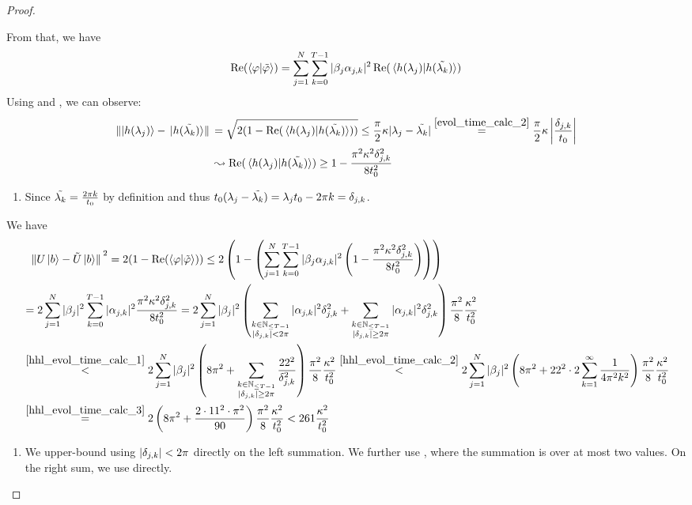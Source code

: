 \begin{proof}
\begin{enumerate}[label=(\roman*), wide]
        From that, we have
        \begin{align}
            \Re(\braket{\varphi}{\tilde{\varphi}}) = \sum_{j=1}^N \sum_{k=0}^{T-1} |\beta_j\alpha_{j, k}|^2 \Re(\braket*{h(\lambda_j)}{h(\tilde{\lambda_k})})
        \end{align}
        Using  and , we can observe:
        \begin{align}
            \norm*{\ket{h(\lambda_j)} - \ket*{h(\tilde{\lambda_k})}} &= \sqrt{2(1-\Re(\braket*{h(\lambda_j)}{h(\tilde{\lambda_k})}))} \leq \frac{\pi}{2}\kappa|\lambda_j-\tilde{\lambda_k}| \overset{\ref{evol_time_calc_2}}{=} \frac{\pi}{2}\kappa\left|\frac{\delta_{j, k}}{t_0}\right|\\
            &\leadsto \Re(\braket*{h(\lambda_j)}{h(\tilde{\lambda_k})}) \geq 1 - \frac{\pi^2\kappa^2\delta_{j, k}^2}{8t_0^2}
        \end{align}
        \begin{enumerate}[label=(\arabic*)]
            \item \label{evol_time_calc_2} Since \(\tilde{\lambda_k} = \frac{2 \pi k}{t_0}\) by definition and thus \(t_0(\lambda_j-\tilde{\lambda_k}) = \lambda_jt_0 - 2\pi k = \delta_{j, k}\).
        \end{enumerate}
        
        We have
        \begin{align}
            &\phantom{=}\norm*{U\ket{b}-\tilde{U}\ket{b}}^2 = 2(1-\Re(\braket{\varphi}{\tilde{\varphi}})) \leq 2 \left(1-\left(\sum_{j=1}^N\sum_{k=0}^{T-1} |\beta_j\alpha_{j, k}|^2 \left(1-\frac{\pi^2\kappa^2\delta_{j, k}^2}{8t_0^2}\right)\right)\right)\\
            &= 2 \sum_{j=1}^N|\beta_j|^2\sum_{k=0}^{T-1} |\alpha_{j, k}|^2 \frac{\pi^2\kappa^2\delta_{j, k}^2}{8t_0^2} = 2\sum_{j=1}^N|\beta_j|^2\left(\sum_{\substack{k \in \mathbb{N}_{\leq T-1}\\|\delta_{j, k}| < 2\pi}} |\alpha_{j, k}|^2 \delta_{j, k}^2+\sum_{\substack{k \in \mathbb{N}_{\leq T-1}\\|\delta_{j, k}| \geq 2\pi}} |\alpha_{j, k}|^2 \delta_{j, k}^2\right)\frac{\pi^2}{8}\frac{\kappa^2}{t_0^2}\\
            &\overset{\ref{hhl_evol_time_calc_1}}{<} 2\sum_{j=1}^N|\beta_j|^2\left(8\pi^2 + \sum_{\substack{k \in \mathbb{N}_{\leq T-1}\\|\delta_{j, k}| \geq 2\pi}} \frac{22^2}{\delta_{j, k}^2}\right)\frac{\pi^2}{8}\frac{\kappa^2}{t_0^2} \overset{\ref{hhl_evol_time_calc_2}}{<} 2\sum_{j=1}^N|\beta_j|^2\left(8\pi^2 + 22^2 \cdot 2\sum_{k=1}^\infty \frac{1}{4\pi^2k^2}\right)\frac{\pi^2}{8}\frac{\kappa^2}{t_0^2}\\
            &\overset{\ref{hhl_evol_time_calc_3}}{=} 2\left(8 \pi^2 + \frac{2 \cdot 11^2 \cdot \pi^2}{90}\right)\frac{\pi^2}{8}\frac{\kappa^2}{t_0^2} < 261\frac{\kappa^2}{t_0^2}
        \end{align}
        \begin{enumerate}[label=(\arabic*)]
            \item \label{hhl_evol_time_calc_1} We upper-bound using \(|\delta_{j, k}| < 2 \pi\) directly on the left summation. We further use , where the summation is over at most two values. On the right sum, we use  directly.


\end{enumerate}
\end{enumerate}
\end{proof}
